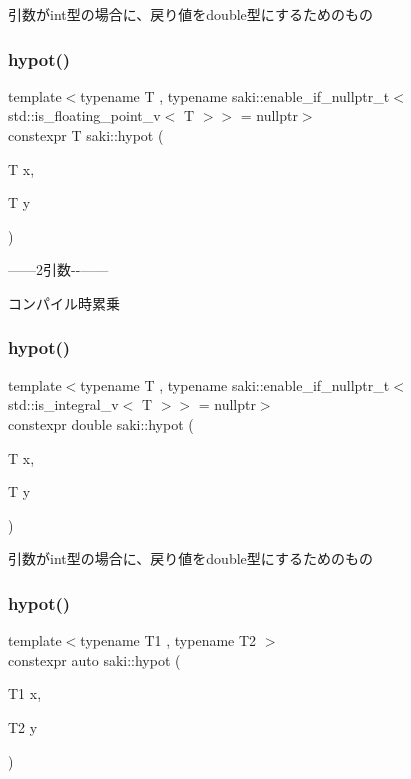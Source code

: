 引数がint型の場合に、戻り値をdouble型にするためのもの 

\mbox{\label{namespacesaki_a0dfe75bfa0e5223a0390c5e2941e69bc}} 
\subsubsection{\texorpdfstring{hypot()}{hypot()}\hspace{0.1cm}{\footnotesize\ttfamily [1/6]}}
{\footnotesize\ttfamily template$<$typename T , typename saki\+::enable\+\_\+if\+\_\+nullptr\+\_\+t$<$ std\+::is\+\_\+floating\+\_\+point\+\_\+v$<$ T $>$$>$  = nullptr$>$ \\
constexpr T saki\+::hypot (\begin{DoxyParamCaption}\item[{T}]{x,  }\item[{T}]{y }\end{DoxyParamCaption})}



------2引数-\/-\/------ 

コンパイル時累乗 \mbox{\label{namespacesaki_ad888da163ba5c006d664d564fb48f7a7}} 
\subsubsection{\texorpdfstring{hypot()}{hypot()}\hspace{0.1cm}{\footnotesize\ttfamily [2/6]}}
{\footnotesize\ttfamily template$<$typename T , typename saki\+::enable\+\_\+if\+\_\+nullptr\+\_\+t$<$ std\+::is\+\_\+integral\+\_\+v$<$ T $>$$>$  = nullptr$>$ \\
constexpr double saki\+::hypot (\begin{DoxyParamCaption}\item[{T}]{x,  }\item[{T}]{y }\end{DoxyParamCaption})}



引数がint型の場合に、戻り値をdouble型にするためのもの 

\mbox{\label{namespacesaki_add6327614e0d389d7545d1ffb151602b}} 
\subsubsection{\texorpdfstring{hypot()}{hypot()}\hspace{0.1cm}{\footnotesize\ttfamily [3/6]}}
{\footnotesize\ttfamily template$<$typename T1 , typename T2 $>$ \\
constexpr auto saki\+::hypot (\begin{DoxyParamCaption}\item[{T1}]{x,  }\item[{T2}]{y }\end{DoxyParamCaption})}



